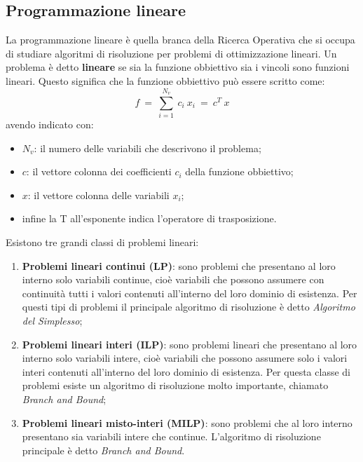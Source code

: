 \subsection{Programmazione lineare}
La programmazione lineare è quella branca della Ricerca Operativa che si occupa di studiare algoritmi di risoluzione per problemi di ottimizzazione lineari.
Un problema è detto \textbf{lineare} se sia la funzione obbiettivo sia i vincoli sono funzioni lineari. Questo significa che la funzione obbiettivo può essere scritto come:
\begin{equation}
f ~ = ~ \sum_{i=1}^{N_v} ~ c_i ~ x_i ~ = ~ c^T ~ x 
\end{equation}
avendo indicato con:
\begin{itemize}
\item $N_v$: il numero delle variabili che descrivono il problema;
\item $c$: il vettore colonna dei coefficienti $c_i$ della funzione obbiettivo;
\item $x$: il vettore colonna delle variabili $x_i$;
\item infine la T all'esponente indica l'operatore di trasposizione.
\end{itemize}

Esistono tre grandi classi di problemi lineari:
\begin{enumerate}
\item \textbf{Problemi lineari continui (LP)}: sono problemi che presentano al loro interno solo variabili continue, cioè variabili che possono assumere con continuità tutti i valori contenuti all'interno del loro dominio di esistenza.
Per questi tipi di problemi il principale algoritmo di risoluzione è detto \textit{Algoritmo del Simplesso};
\item \textbf{Problemi lineari interi (ILP)}: sono problemi lineari che presentano al loro interno solo variabili intere, cioè variabili che possono assumere solo i valori interi contenuti all'interno del loro dominio di esistenza.
Per questa classe di problemi esiste un algoritmo di risoluzione molto importante, chiamato \textit{Branch and Bound};
\item \textbf{Problemi lineari misto-interi (MILP)}: sono problemi che al loro interno presentano sia variabili intere che continue. L'algoritmo di risoluzione principale è detto \textit{Branch and Bound}.
\end{enumerate}


